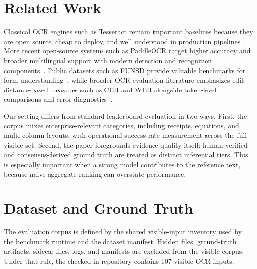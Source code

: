\documentclass[conference]{IEEEtran}
\begin{document}
\section{Related Work}

Classical OCR engines such as Tesseract remain important baselines because they are open source, cheap to deploy, and well understood in production pipelines~\cite{smith2007tesseract}. More recent open-source systems such as PaddleOCR target higher accuracy and broader multilingual support with modern detection and recognition components~\cite{paddleocr2020}. Public datasets such as FUNSD provide valuable benchmarks for form understanding~\cite{funsd}, while broader OCR evaluation literature emphasizes edit-distance-based measures such as CER and WER alongside token-level comparisons and error diagnostics~\cite{levenshtein1966,rice1996measuring}.

Our setting differs from standard leaderboard evaluation in two ways. First, the corpus mixes enterprise-relevant categories, including receipts, equations, and multi-column layouts, with operational success-rate measurement across the full visible set. Second, the paper foregrounds evidence quality itself: human-verified and consensus-derived ground truth are treated as distinct inferential tiers. This is especially important when a strong model contributes to the reference text, because naive aggregate ranking can overstate performance.

\section{Dataset and Ground Truth}

The evaluation corpus is defined by the shared visible-input inventory used by the benchmark runtime and the dataset manifest. Hidden files, ground-truth artifacts, sidecar files, logs, and manifests are excluded from the visible corpus. Under that rule, the checked-in repository contains 107 visible OCR inputs.

\begin{table}[t]
\centering
\caption{Locked corpus and ground-truth coverage. Visible counts are authoritative for this manuscript.}
\label{tab:dataset}
\footnotesize
{}
\end{table}
\end{document}
